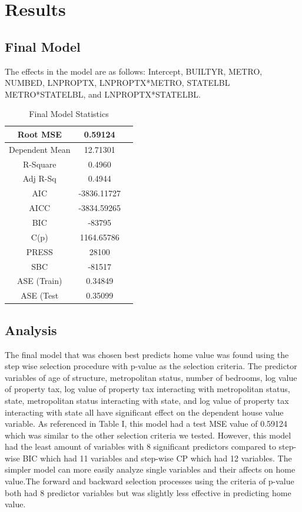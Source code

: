 \section{Results}
\label{sec:results}

\subsection{Final Model}

The effects in the model are as follows: Intercept, BUILTYR, METRO, NUMBED, LNPROPTX, LNPROPTX*METRO, STATELBL METRO*STATELBL, and LNPROPTX*STATELBL.

\begin{table}[ht]
\scriptsize
\centering
\caption{Final Model Statistics}
\begin{tabular}{|c|c|l}
\hline
Root MSE       & 0.59124     \\
\hline
Dependent Mean & 12.71301    \\
\hline
R-Square       & 0.4960      \\
\hline
Adj R-Sq       & 0.4944      \\
\hline
AIC            & -3836.11727 \\
\hline
AICC           & -3834.59265 \\
\hline
BIC            & -83795      \\
\hline
C(p)           & 1164.65786  \\
\hline
PRESS          & 28100       \\
\hline
SBC            & -81517      \\
\hline
ASE (Train)    & 0.34849     \\
\hline
ASE (Test      & 0.35099     \\
\hline
\end{tabular}
\end{table}


\subsection{Analysis}

The final model that was chosen best predicts home value was found using the step wise selection procedure with p-value as the selection criteria. The predictor variables of age of structure, metropolitan status, number of bedrooms, log value of property tax, log value of property tax interacting with metropolitan status, state, metropolitan status interacting with state, and log value of property tax interacting with state all have significant effect on the dependent house value variable. As referenced in Table I, this model had a test MSE value of 0.59124 which was similar to the other selection criteria we tested. However, this model had the least amount of variables with 8 significant predictors compared to step-wise BIC which had 11 variables and step-wise CP which had 12 variables. The simpler model can more easily analyze single variables and their affects on home value.The forward and backward selection processes using the criteria of p-value both had 8 predictor variables but was slightly less effective in predicting home value. 


